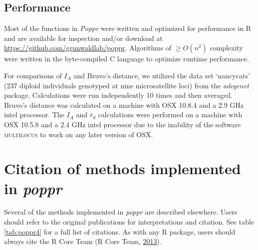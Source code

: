 \documentclass[double,12pt]{beavtex}
\begin{document}
  \subsection{Performance}\label{performance}
  
  Most of the functions in \emph{Poppr} were written and optimized for
  performance in R and are available for inspection and/or download at
  \url{https://github.com/grunwaldlab/poppr}. Algorithms of
  \(\geq O(n^2)\) complexity were written in the byte-compiled C language
  to optimize runtime performance.
  
  For comparisons of \(I_A\) and Bruvo's distance, we utilized the data
  set `nancycats' (237 diploid individuals genotyped at nine
  microsatellite loci) from the \emph{adegenet} package. Calculations were
  run independently 10 times and then averaged. Bruvo's distance was
  calculated on a machine with OSX 10.8.4 and a 2.9 GHz intel processor.
  The \(I_A\) and \(\bar{r}_d\) calculations were performed on a machine
  with OSX 10.5.8 and a 2.4 GHz intel processor due to the inability of
  the software \textsc{multilocus} to work on any later version of OSX.
  
  \section{\texorpdfstring{Citation of methods implemented in
  \emph{poppr}}{Citation of methods implemented in poppr}}\label{citation-of-methods-implemented-in-poppr}
  
  Several of the methods implemented in \emph{poppr} are described
  elsewhere. Users should refer to the original publications for
  interpretations and citation. See table \ref{tab:poppr4} for a full list
  of citations. As with any R package, users should always cite the R Core
  Team (R Core Team, \protect\hyperlink{ref-R2013}{2013}).
  
\end{document}
